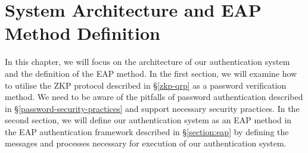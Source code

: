 \chapter{System Architecture and EAP Method Definition}
\label{chapter:3}

\noindent 
In this chapter, we will focus on the architecture of our authentication system and the definition of the EAP method.
In the first section, we will examine how to utilise the ZKP protocol described in \S\ref{zkp-qrp} as a password verification method.
We need to be aware of the pitfalls of password authentication described in \S\ref{password-security-practices} and support necessary security practices.
In the second section, we will define our authentication system as an EAP method in the EAP authentication framework described in \S\ref{section:eap} by defining the messages and processes necessary for execution of our authentication system.